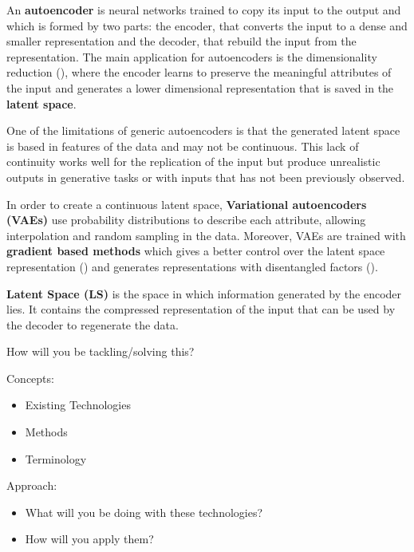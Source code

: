 An \textbf{autoencoder} is neural networks trained to copy its input to the output and which is formed by two parts: the encoder, that converts the input to a dense and smaller representation and the decoder, that rebuild the input from the representation. The main application for autoencoders is the dimensionality reduction (\cite{Hinton504}), where the encoder learns to preserve the meaningful attributes of the input and generates a lower dimensional representation that is saved in the \textbf{latent space}.

One of the limitations of generic autoencoders is that the generated latent space is based in features of the data and may not be continuous. This lack of continuity works well for the replication of the input but produce unrealistic outputs in generative tasks or with inputs that has not been previously observed.

In order to create a continuous latent space, \textbf{Variational autoencoders (VAEs)} use probability distributions to describe each attribute, allowing interpolation and random sampling in the data. Moreover, VAEs are trained with \textbf{gradient based methods} which gives a better control over the latent space representation (\cite{goodfellow2016deep}) and generates representations with disentangled factors (\cite{2016arXiv160605579H}).

\textbf{Latent Space (LS)} is the space in which information generated by the encoder lies. It contains the compressed representation of the input that can be used by the decoder to regenerate the data. 

\hrulefill

How will you be tackling/solving this?



Concepts:
\begin{itemize}
\item Existing Technologies
\item Methods
\item Terminology
\end{itemize}

Approach:
\begin{itemize}
\item What will you be doing with these technologies?
\item How will you apply them?
\end{itemize}